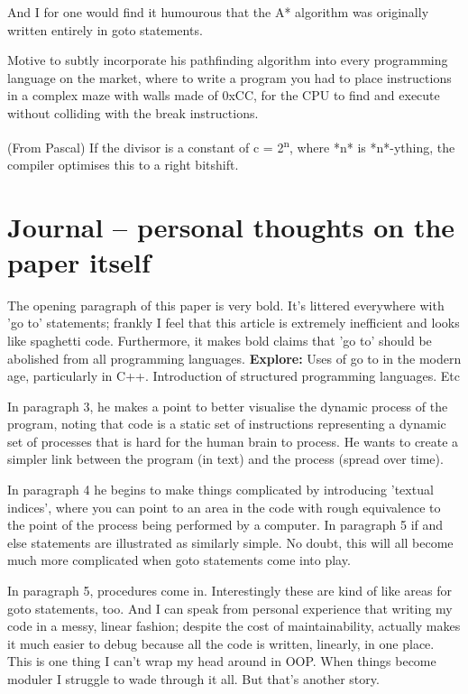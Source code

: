 \documentclass{journal}
\begin{document}
And I for one would find it humourous that the A* algorithm was originally written entirely in goto statements.

Motive to subtly incorporate his pathfinding algorithm into every programming language on the market, where to write a program you had to place instructions in a complex maze with walls made of 0xCC, for the CPU to find and execute without colliding with the break instructions.

(From Pascal) If the divisor is a constant of c = 2\textsuperscript{n}, where *n* is *n*-ything, the compiler optimises this to a right bitshift.

\section{Journal -- personal thoughts on the paper itself}
The opening paragraph of this paper is very bold. It's littered everywhere with 'go to' statements; frankly I feel that this article is extremely inefficient and looks like spaghetti code. Furthermore, it makes bold claims that 'go to' should be abolished from all programming languages. \textbf{Explore:} Uses of go to in the modern age, particularly in C++. Introduction of structured programming languages. Etc

In paragraph 3, he makes a point to better visualise the dynamic process of the program, noting that code is a static set of instructions representing a dynamic set of processes that is hard for the human brain to process. He wants to create a simpler link between the program (in text) and the process (spread over time).

In paragraph 4 he begins to make things complicated by introducing 'textual indices', where you can point to an area in the code with rough equivalence to the point of the process being performed by a computer. In paragraph 5 if and else statements are illustrated as similarly simple. No doubt, this will all become much more complicated when goto statements come into play.

In paragraph 5, procedures come in. Interestingly these are kind of like areas for goto statements, too. And I can speak from personal experience that writing my code in a messy, linear fashion; despite the cost of maintainability, actually makes it much easier to debug because all the code is written, linearly, in one place. This is one thing I can't wrap my head around in OOP. When things become moduler I struggle to wade through it all. But that's another story.
\end{document}
